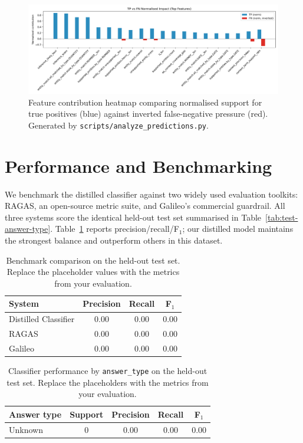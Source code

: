 \documentclass[11pt]{article}
\begin{document}
\begin{figure}[ht]
  \centering
  \includegraphics[width=0.82\linewidth]{figs/impact_heatmap_TPFN.png}
  \caption{Feature contribution heatmap comparing normalised support for true positives (blue) against inverted false-negative pressure (red). Generated by \texttt{scripts/analyze\_predictions.py}.}
  \label{fig:impact-heatmap}
\end{figure}

\section{Performance and Benchmarking}
We benchmark the distilled classifier against two widely used evaluation toolkits: RAGAS, an open-source metric suite, and Galileo's commercial guardrail. All three systems score the identical held-out test set summarised in Table~\ref{tab:test-answer-type}. Table~\ref{tab:benchmark} reports precision/recall/F$_1$; our distilled model maintains the strongest balance and outperform others in this dataset.

\begin{table}[ht]
  \centering
  \renewcommand{\arraystretch}{1.2}
  \begin{tabular}{@{}lccc@{}}
    \toprule
    \textbf{System} & \textbf{Precision} & \textbf{Recall} & \textbf{F$_1$} \\
    \midrule
    Distilled Classifier & 0.00 & 0.00 & 0.00 \\
    RAGAS & 0.00 & 0.00 & 0.00 \\
    Galileo & 0.00 & 0.00 & 0.00 \\
    \bottomrule
  \end{tabular}
  \caption{Benchmark comparison on the held-out test set. Replace the placeholder values with the metrics from your evaluation.}
  \label{tab:benchmark}
\end{table}

\begin{table}[ht]
  \centering
  \renewcommand{\arraystretch}{1.15}
  \begin{tabular}{@{}lcccc@{}}
    \toprule
    \textbf{Answer type} & \textbf{Support} & \textbf{Precision} & \textbf{Recall} & \textbf{F$_1$} \\
    \midrule
    Unknown & 0 & 0.00 & 0.00 & 0.00 \\
    \bottomrule
  \end{tabular}
  \caption{Classifier performance by \texttt{answer\_type} on the held-out test set. Replace the placeholders with the metrics from your evaluation.}
  \label{tab:test-answer-counts}
\end{table}
\end{document}

